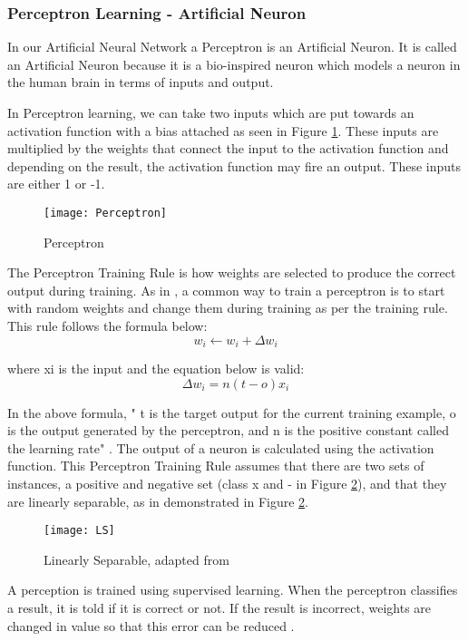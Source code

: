 \subsubsection*{Perceptron Learning - Artificial Neuron}
In our Artificial Neural Network a Perceptron is an Artificial Neuron.
It is called an Artificial Neuron because it is a bio-inspired neuron which models
a neuron in the human brain in terms of inputs and output.

In Perceptron learning, we can take two inputs which are put towards an
activation function with a bias attached as seen in Figure \ref{fig:perceptron}.
These inputs are multiplied by the weights that connect the input to the
activation function and depending on the result, the activation function may
fire an output. These inputs are either 1 or -1.

\begin{figure}[h]
	\centering
     \texttt{[image: Perceptron]}
     \caption{Perceptron}
     \label{fig:perceptron}
\end{figure}

The Perceptron Training Rule is how weights are selected to produce the correct output during training.
As in \parencite{MLANN}, a common way to train a perceptron is to start with random weights and change them during training as per the training rule.
This rule follows the formula below:
\[w_{i} \leftarrow w_{i} + \Delta w_{i}\]

where xi is the input and the equation below is valid:
\[\Delta w_{i} = n(t-o)x_{i}\]

In the above formula, " t is the target output for the current training example, o is the output generated by the perceptron, and n is the positive constant called the learning rate" \parencite{MLANN}.
The output of a neuron is calculated using the activation function.
This Perceptron Training Rule assumes that there are two sets of instances, a
positive and negative set (class x and - in Figure \ref{fig:ls}), and that they are linearly separable, as in demonstrated in Figure \ref{fig:ls}. 

\begin{figure}[h]
	\centering
    \texttt{[image: LS]}
     \caption{Linearly Separable, adapted from \parencite{MLANN}}
     \label{fig:ls}
\end{figure}

A perception is trained using supervised learning. When the perceptron
classifies a result, it is told if it is correct or not. If the result is
incorrect, weights are changed in value so that this error can be reduced
\parencite{AI}. 

